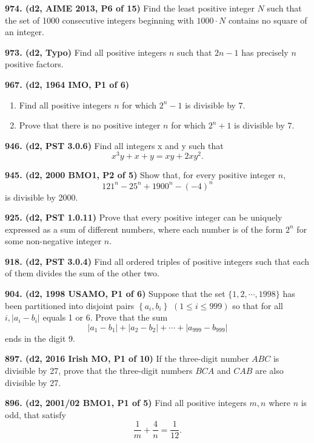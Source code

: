 \documentclass{article}
\begin{document}
\textbf{974. (\color{red}d2\color{black}, AIME 2013, P6 of 15)} Find the least positive integer $N$ such that the set of 1000 consecutive integers beginning with $1000 \cdot N$ contains no square of an integer.

\textbf{973. (\color{red}d2\color{black}, Typo)} Find all positive integers $n$ such that $2n-1$ has precisely $n$ positive factors.

\textbf{967. (\color{red}d2\color{black}, 1964 IMO, P1 of 6)}
\begin{enumerate}
    \item Find all positive integers $ n$ for which $ 2^n-1$ is divisible by $ 7$.
    \item Prove that there is no positive integer $ n$ for which $ 2^n+1$ is divisible by $ 7$.
\end{enumerate}

\textbf{946. (\color{red}d2\color{black}, PST 3.0.6)} Find all integers x and y such that \[x^3y + x + y = xy + 2xy^2.\]

\textbf{945. (\color{red}d2\color{black}, 2000 BMO1, P2 of 5)} Show that, for every positive integer $n$, \begin{equation*}121^n - 25^n + 1900^n - (-4)^n\end{equation*} is divisible by 2000.

\textbf{925. (\color{red}d2\color{black}, PST 1.0.11)} Prove that every positive integer can be uniquely expressed as a sum of different numbers,
where each number is of the form \(2^n\) for some non-negative integer \(n\).

\textbf{918. (\color{red}d2\color{black}, PST 3.0.4)} Find all ordered triples of positive integers such that each of them divides the sum of the other two.

\textbf{904. (\color{red}d2\color{black}, 1998 USAMO, P1 of 6)} Suppose that the set $\{1,2, \cdots, 1998\}$ has been partitioned into disjoint pairs $\left\{a_{i}, b_{i}\right\}$ $(1 \leq i \leq 999)$ so that for all $i,\left|a_{i}-b_{i}\right|$ equals 1 or 6. Prove that the sum
$$
    \left|a_{1}-b_{1}\right|+\left|a_{2}-b_{2}\right|+\cdots+\left|a_{999}-b_{999}\right|
$$
ends in the digit 9.

\textbf{897. (\color{red}d2\color{black}, 2016 Irish MO, P1 of 10)} If the three-digit number $ABC$ is divisible by 27, prove that the three-digit numbers $BCA$ and $CAB$ are also divisible by 27.

\textbf{896. (\color{red}d2\color{black}, 2001/02 BMO1, P1 of 5)} Find all positive integers $m, n$ where $n$ is odd, that satisfy \begin{equation*}\frac{1}{m} + \frac{4}{n} = \frac{1}{12}.\end{equation*}
\end{document}
